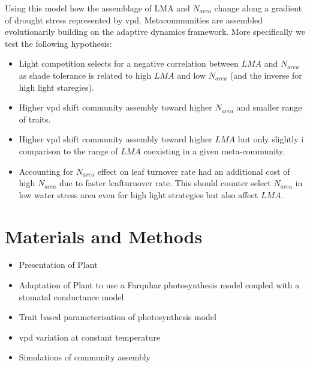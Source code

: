 \documentclass[a4paper,11pt]{article}
\begin{document}
Using this model how the assemblage of LMA and $N_{area}$ change along a gradient of drought stress represented by vpd. Metacommunities are assembled evolutionarily building on the adaptive dynamics framework. More specifically we test the following hypothesis:  
 
\begin{itemize}

\item Light competition selects for a negative correlation between $LMA$ and $N_{area}$ as shade tolerance is related to high $LMA$ and low $N_{area}$ (and the inverse for high light staregies).

\item Higher vpd shift community assembly toward higher $N_{area}$ and smaller range of traits.

\item Higher vpd shift community assembly toward higher $LMA$ but only slightly i comparison to the range of $LMA$ coexisting in a given meta-community.

\item Accounting for $N_{area}$ effect on leaf turnover rate had an additional cost of high $N_{area}$ due to faster leafturnover rate. This should counter select $N_{area}$ in low water stress area even for high light strategies but also affect $LMA$.

\end{itemize}


\section{Materials and Methods}


\begin{itemize}

\item Presentation of Plant

\item Adaptation of Plant to use a Farquhar photosynthesis model coupled with a stomatal conductance model

\item Trait based parameterisation of photosynthesis model

\item vpd variation at constant temperature
  
\item Simulations of community assembly 

\end{itemize}
\end{document}
